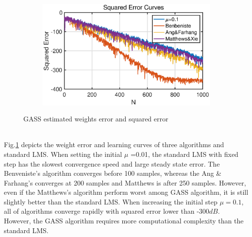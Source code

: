 \begin{figure}[htbp]
\begin{subfigure}[b]{0.4\textwidth}
     \end{subfigure}
      ~
     \begin{subfigure}[b]{0.4\textwidth}
         \centering
         \includegraphics[width=\textwidth]{fig/22/22a4.eps}
     \end{subfigure}
        \caption{GASS estimated weights error and squared error}
        \label{fig:2_2_a}
\end{figure}\\
Fig.\ref{fig:2_2_a} depicts the weight error and learning curves of three algorithms and standard LMS. When setting the initial $\mu$ =0.01, the standard LMS with fixed step has the slowest convergence speed and large steady state error. The Benveniste's algorithm converges before 100 samples, whereas the Ang \& Farhang's converges at 200 samples and Matthews is after 250 samples. However, even if the Matthews's algorithm perform worst among GASS algorithm, it is still slightly better than the standard LMS. When increasing the initial step $\mu=0.1$, all of algorithms converge rapidly with squared error lower than -300$dB$. However, the GASS algorithm requires more computational complexity than the standard LMS.
